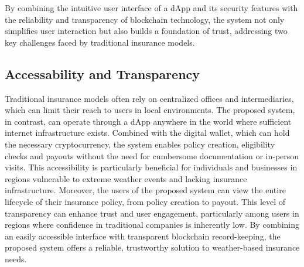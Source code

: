 By combining the intuitive user interface of a dApp and its security features with the reliability and transparency of blockchain technology, the system not only simplifies user interaction but also builds a foundation of trust, addressing two key challenges faced by traditional insurance models.

\subsection{Accessability and Transparency}\label{accessibility_transparency}
Traditional insurance models often rely on centralized offices and intermediaries, which can limit their reach to users in local environments. The proposed system, in contrast, can operate through a dApp anywhere in the world where sufficient internet infrastructure exists. Combined with the digital wallet, which can hold the necessary cryptocurrency, the system enables policy creation, eligibility checks and payouts without the need for cumbersome documentation or in-person visits. This accessibility is particularly beneficial for individuals and businesses in regions vulnerable to extreme weather events and lacking insurance infrastructure. Moreover, the users of the proposed system can view the entire lifecycle of their insurance policy, from policy creation to payout. This level of transparency can enhance trust and user engagement, particularly among users in regions where confidence in traditional companies is inherently low. By combining an easily accessible interface with transparent blockchain record-keeping, the proposed system offers a reliable, trustworthy solution to weather-based insurance needs.